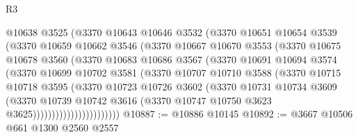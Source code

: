 \begin{lexlean}{R3}
\begin{coremodule}
                      @10638
                      @3525
                      (@3370
                        @10643
                        @10646
                        @3532
                        (@3370
                          @10651
                          @10654
                          @3539
                          (@3370
                            @10659
                            @10662
                            @3546
                            (@3370
                              @10667
                              @10670
                              @3553
                              (@3370
                                @10675
                                @10678
                                @3560
                                (@3370
                                  @10683
                                  @10686
                                  @3567
                                  (@3370
                                    @10691
                                    @10694
                                    @3574
                                    (@3370
                                      @10699
                                      @10702
                                      @3581
                                      (@3370
                                        @10707
                                        @10710
                                        @3588
                                        (@3370
                                          @10715
                                          @10718
                                          @3595
                                          (@3370
                                            @10723
                                            @10726
                                            @3602
                                            (@3370
                                              @10731
                                              @10734
                                              @3609
                                              (@3370
                                                @10739
                                                @10742
                                                @3616
                                                (@3370
                                                  @10747
                                                  @10750
                                                  @3623
                                                  @3625)))))))))))))))))))))))
@10887 := @10886 @10145
@10892 := @3667 @10506 @661 @1300 @2560 @2557

\end{coremodule}
\end{lexlean}
